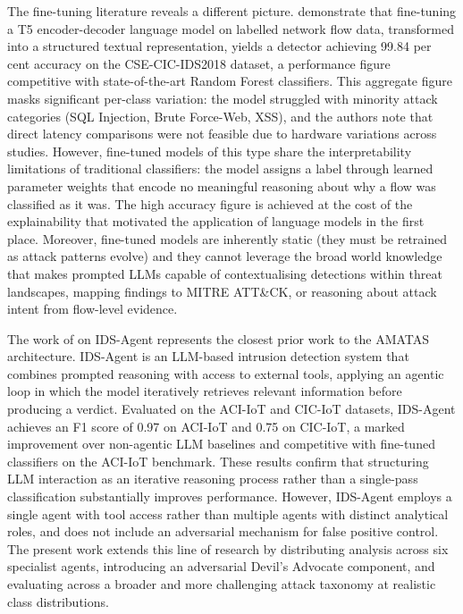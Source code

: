 \documentclass[../main.tex]{subfiles}
\begin{document}
The fine-tuning literature reveals a different picture. \textcite{GutierrezGaleano2025} demonstrate that fine-tuning a T5 encoder-decoder language model on labelled network flow data, transformed into a structured textual representation, yields a detector achieving 99.84 per cent accuracy on the CSE-CIC-IDS2018 dataset, a performance figure competitive with state-of-the-art Random Forest classifiers. This aggregate figure masks significant per-class variation: the model struggled with minority attack categories (SQL Injection, Brute Force-Web, XSS), and the authors note that direct latency comparisons were not feasible due to hardware variations across studies. However, fine-tuned models of this type share the interpretability limitations of traditional classifiers: the model assigns a label through learned parameter weights that encode no meaningful reasoning about why a flow was classified as it was. The high accuracy figure is achieved at the cost of the explainability that motivated the application of language models in the first place. Moreover, fine-tuned models are inherently static (they must be retrained as attack patterns evolve) and they cannot leverage the broad world knowledge that makes prompted LLMs capable of contextualising detections within threat landscapes, mapping findings to MITRE ATT\&CK, or reasoning about attack intent from flow-level evidence.

The work of \textcite{Li2024} on IDS-Agent represents the closest prior work to the AMATAS architecture. IDS-Agent is an LLM-based intrusion detection system that combines prompted reasoning with access to external tools, applying an agentic loop in which the model iteratively retrieves relevant information before producing a verdict. Evaluated on the ACI-IoT and CIC-IoT datasets, IDS-Agent achieves an F1 score of 0.97 on ACI-IoT and 0.75 on CIC-IoT, a marked improvement over non-agentic LLM baselines and competitive with fine-tuned classifiers on the ACI-IoT benchmark. These results confirm that structuring LLM interaction as an iterative reasoning process rather than a single-pass classification substantially improves performance. However, IDS-Agent employs a single agent with tool access rather than multiple agents with distinct analytical roles, and does not include an adversarial mechanism for false positive control. The present work extends this line of research by distributing analysis across six specialist agents, introducing an adversarial Devil's Advocate component, and evaluating across a broader and more challenging attack taxonomy at realistic class distributions.
\end{document}
